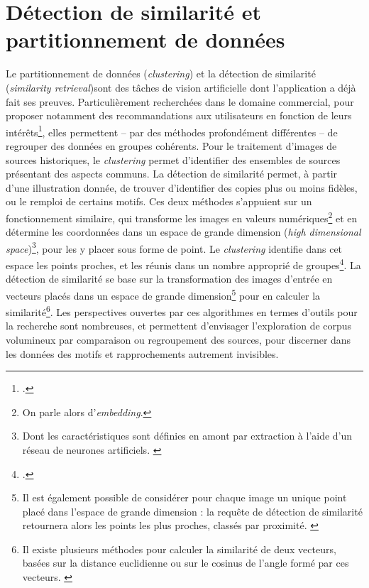 \documentclass[a4paper,12pt,twoside]{book}
\begin{document}
        \chapter[\textit{Similarity retrieval} et \textit{clustering}]{Détection de similarité et partitionnement de données}
        Le partitionnement de données (\textit{clustering}) et la détection de similarité (\textit{similarity retrieval})sont des tâches de vision artificielle dont l'application a déjà fait ses preuves. Particulièrement recherchées dans le domaine commercial, pour proposer notamment des recommandations aux utilisateurs en fonction de leurs intérêts\footcite{gronneIntroductionEmbeddingClustering2022}, elles permettent -- par des méthodes profondément différentes -- de regrouper des données en groupes cohérents. Pour le traitement d'images de sources historiques, le \textit{clustering} permet d'identifier des ensembles de sources présentant des aspects communs. La détection de similarité permet, à partir d'une illustration donnée, de trouver d'identifier des copies plus ou moins fidèles, ou le remploi de certains motifs. Ces deux méthodes s'appuient sur un fonctionnement similaire, qui transforme les images en valeurs numériques\footnote{On parle alors d'\textit{embedding}.} et en détermine les coordonnées dans un espace de grande dimension (\textit{high dimensional space})\footnote{Dont les caractéristiques sont définies en amont par extraction à l'aide d'un réseau de neurones artificiels. \cite{moiraghiExplorerCorpusImages2018}}, pour les y placer sous forme de point. Le \textit{clustering} identifie dans cet espace les points proches, et les réunis dans un nombre approprié de groupes\footcite{gronneIntroductionEmbeddingClustering2022}. La détection de similarité se base sur la transformation des images d'entrée en vecteurs placés dans un espace de grande dimension\footnote{ Il est également possible de considérer pour chaque image un unique point placé dans l'espace de grande dimension : la requête de détection de similarité retournera alors les points les plus proches, classés par proximité. \cite{dilenardoVisualPatternsDiscovery}} pour en calculer la similarité\footnote{Il existe plusieurs méthodes pour calculer la similarité de deux vecteurs, basées sur la distance euclidienne ou sur le cosinus de l'angle formé par ces vecteurs. \cite{gronneIntroductionEmbeddingClustering2022}}. Les perspectives ouvertes par ces algorithmes en termes d'outils pour la recherche sont nombreuses, et permettent d'envisager l'exploration de corpus volumineux par comparaison ou regroupement des sources, pour discerner dans les données des motifs et rapprochements autrement invisibles.
        
\end{document}
